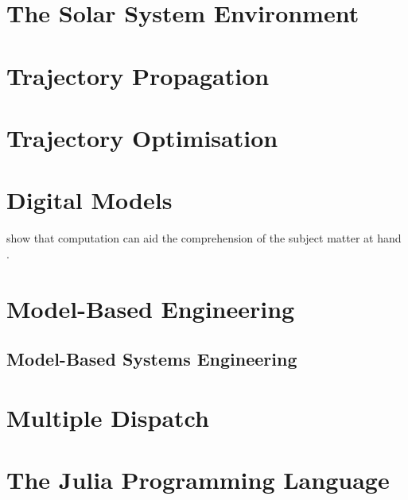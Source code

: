 \section{The Solar System Environment}
\label{sec:solar-system-environment}
\section{Trajectory Propagation}
\label{sec:trajectory-propagation}
\section{Trajectory Optimisation}
\label{sec:trajectoty-optimisation}

\section{Digital Models}
\label{sec:digital-models}
\autocite{hinsen-computational-2014}
\autocite{hinsen-scientific-2016}
\citeauthor{sussman-role-2002} show that computation can aid the comprehension of the subject matter at hand \autocite{sussman-role-2002}.

\section{Model-Based Engineering}
\label{sec:model-based-engineering}

\subsection{Model-Based Systems Engineering}
\label{sec:model-based-systems-engineering}

\section{Multiple Dispatch}
\label{sec:multiple-dispatch}

\section{The Julia Programming Language}
\label{sec:julia}

